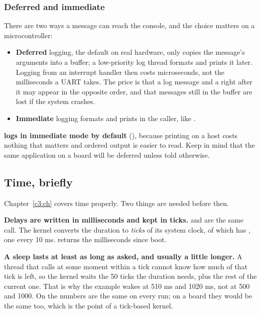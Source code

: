 \subsubsection{Deferred and immediate}
There are two ways a message can reach the console, and the choice matters on a microcontroller:

\begin{itemize}
  \item \textbf{Deferred} logging, the default on real hardware, only copies the message’s arguments into a
    buffer; a low-priority log thread formats and prints it later. Logging from an interrupt handler
    then costs microseconds, not the milliseconds a UART takes. The price is that a log message and a
     right after it may appear in the opposite order, and that messages still in the
    buffer are lost if the system crashes.
  \item \textbf{Immediate} logging formats and prints in the caller, like .
\end{itemize}

\textbf{ logs in immediate mode by default} (),
because printing on a host costs nothing that matters and ordered output is easier to read. Keep in
mind that the same application on a board will be deferred unless told otherwise.

\subsection{Time, briefly}
Chapter~\ref{c3:ch} covers time properly. Two things are needed before then.

\textbf{Delays are written in milliseconds and kept in ticks.}  and
 are the same call. The kernel converts the duration to \emph{ticks} of
its system clock, of which  has , one
every 10 ms.  returns the milliseconds since boot.

\textbf{A sleep lasts at least as long as asked, and usually a little longer.} A thread that calls
 at some moment within a tick cannot know how much of that tick is left, so the
kernel waits the 50 ticks the duration needs, plus the rest of the current one. That is why the
 example wakes at 510 ms and 1020 ms, not at 500 and 1000. On
 the numbers are the same on every run; on a board they would be the same too,
which is the point of a tick-based kernel.

